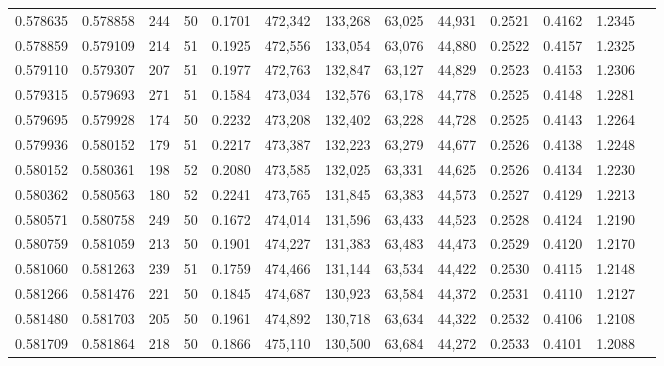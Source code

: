 \begin{tabular}{rrrrrrrrrrrrr}
0.578635 & 0.578858 &   244 &  50 &                                     0.1701 & 472,342 & 133,268 &  63,025 &  44,931 & 0.2521 & 0.4162 & 1.2345 \\
0.578859 & 0.579109 &   214 &  51 &                                     0.1925 & 472,556 & 133,054 &  63,076 &  44,880 & 0.2522 & 0.4157 & 1.2325 \\
0.579110 & 0.579307 &   207 &  51 &                                     0.1977 & 472,763 & 132,847 &  63,127 &  44,829 & 0.2523 & 0.4153 & 1.2306 \\
0.579315 & 0.579693 &   271 &  51 &                                     0.1584 & 473,034 & 132,576 &  63,178 &  44,778 & 0.2525 & 0.4148 & 1.2281 \\
0.579695 & 0.579928 &   174 &  50 &                                     0.2232 & 473,208 & 132,402 &  63,228 &  44,728 & 0.2525 & 0.4143 & 1.2264 \\
0.579936 & 0.580152 &   179 &  51 &                                     0.2217 & 473,387 & 132,223 &  63,279 &  44,677 & 0.2526 & 0.4138 & 1.2248 \\
0.580152 & 0.580361 &   198 &  52 &                                     0.2080 & 473,585 & 132,025 &  63,331 &  44,625 & 0.2526 & 0.4134 & 1.2230 \\
0.580362 & 0.580563 &   180 &  52 &                                     0.2241 & 473,765 & 131,845 &  63,383 &  44,573 & 0.2527 & 0.4129 & 1.2213 \\
0.580571 & 0.580758 &   249 &  50 &                                     0.1672 & 474,014 & 131,596 &  63,433 &  44,523 & 0.2528 & 0.4124 & 1.2190 \\
0.580759 & 0.581059 &   213 &  50 &                                     0.1901 & 474,227 & 131,383 &  63,483 &  44,473 & 0.2529 & 0.4120 & 1.2170 \\
0.581060 & 0.581263 &   239 &  51 &                                     0.1759 & 474,466 & 131,144 &  63,534 &  44,422 & 0.2530 & 0.4115 & 1.2148 \\
0.581266 & 0.581476 &   221 &  50 &                                     0.1845 & 474,687 & 130,923 &  63,584 &  44,372 & 0.2531 & 0.4110 & 1.2127 \\
0.581480 & 0.581703 &   205 &  50 &                                     0.1961 & 474,892 & 130,718 &  63,634 &  44,322 & 0.2532 & 0.4106 & 1.2108 \\
0.581709 & 0.581864 &   218 &  50 &                                     0.1866 & 475,110 & 130,500 &  63,684 &  44,272 & 0.2533 & 0.4101 & 1.2088 \\

\end{tabular}
